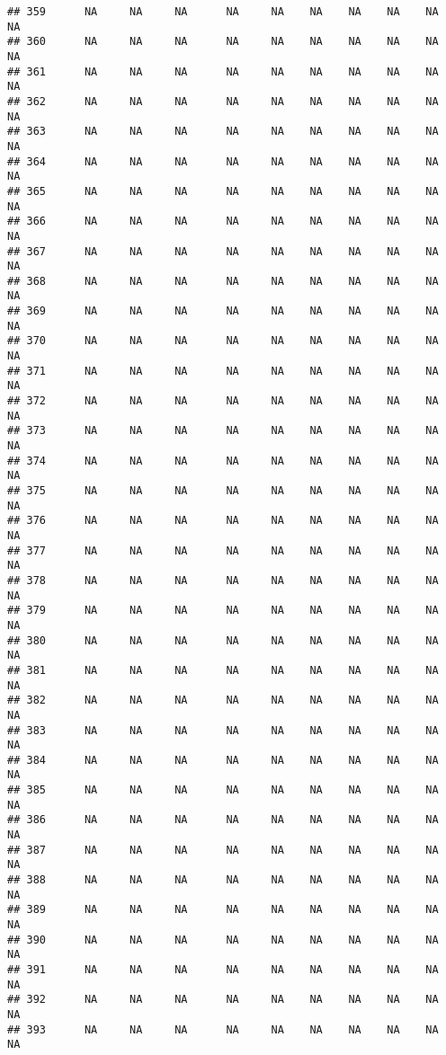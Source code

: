 \documentclass{article}\usepackage{graphicx, color}
\makeatletter
\newenvironment{kframe}{%
 \def\at@end@of@kframe{}%
 \ifinner\ifhmode%
  \def\at@end@of@kframe{\end{minipage}}%
  \begin{minipage}{\columnwidth}%
 \fi\fi%
 \def\FrameCommand##1{\hskip\@totalleftmargin \hskip-\fboxsep
 \colorbox{shadecolor}{##1}\hskip-\fboxsep
     \hskip-\linewidth \hskip-\@totalleftmargin \hskip\columnwidth}%
 \MakeFramed {\advance\hsize-\width
   \@totalleftmargin\z@ \linewidth\hsize
   \@setminipage}}%
 {\par\unskip\endMakeFramed%
 \at@end@of@kframe}
\newenvironment{knitrout}{}{} %
\makeatother
\begin{document}
\begin{knitrout}
\begin{kframe}
\begin{verbatim}
## 359      NA     NA     NA      NA     NA    NA    NA    NA    NA     NA
## 360      NA     NA     NA      NA     NA    NA    NA    NA    NA     NA
## 361      NA     NA     NA      NA     NA    NA    NA    NA    NA     NA
## 362      NA     NA     NA      NA     NA    NA    NA    NA    NA     NA
## 363      NA     NA     NA      NA     NA    NA    NA    NA    NA     NA
## 364      NA     NA     NA      NA     NA    NA    NA    NA    NA     NA
## 365      NA     NA     NA      NA     NA    NA    NA    NA    NA     NA
## 366      NA     NA     NA      NA     NA    NA    NA    NA    NA     NA
## 367      NA     NA     NA      NA     NA    NA    NA    NA    NA     NA
## 368      NA     NA     NA      NA     NA    NA    NA    NA    NA     NA
## 369      NA     NA     NA      NA     NA    NA    NA    NA    NA     NA
## 370      NA     NA     NA      NA     NA    NA    NA    NA    NA     NA
## 371      NA     NA     NA      NA     NA    NA    NA    NA    NA     NA
## 372      NA     NA     NA      NA     NA    NA    NA    NA    NA     NA
## 373      NA     NA     NA      NA     NA    NA    NA    NA    NA     NA
## 374      NA     NA     NA      NA     NA    NA    NA    NA    NA     NA
## 375      NA     NA     NA      NA     NA    NA    NA    NA    NA     NA
## 376      NA     NA     NA      NA     NA    NA    NA    NA    NA     NA
## 377      NA     NA     NA      NA     NA    NA    NA    NA    NA     NA
## 378      NA     NA     NA      NA     NA    NA    NA    NA    NA     NA
## 379      NA     NA     NA      NA     NA    NA    NA    NA    NA     NA
## 380      NA     NA     NA      NA     NA    NA    NA    NA    NA     NA
## 381      NA     NA     NA      NA     NA    NA    NA    NA    NA     NA
## 382      NA     NA     NA      NA     NA    NA    NA    NA    NA     NA
## 383      NA     NA     NA      NA     NA    NA    NA    NA    NA     NA
## 384      NA     NA     NA      NA     NA    NA    NA    NA    NA     NA
## 385      NA     NA     NA      NA     NA    NA    NA    NA    NA     NA
## 386      NA     NA     NA      NA     NA    NA    NA    NA    NA     NA
## 387      NA     NA     NA      NA     NA    NA    NA    NA    NA     NA
## 388      NA     NA     NA      NA     NA    NA    NA    NA    NA     NA
## 389      NA     NA     NA      NA     NA    NA    NA    NA    NA     NA
## 390      NA     NA     NA      NA     NA    NA    NA    NA    NA     NA
## 391      NA     NA     NA      NA     NA    NA    NA    NA    NA     NA
## 392      NA     NA     NA      NA     NA    NA    NA    NA    NA     NA
## 393      NA     NA     NA      NA     NA    NA    NA    NA    NA     NA

\end{verbatim}
\end{kframe}
\end{knitrout}
\end{document}
